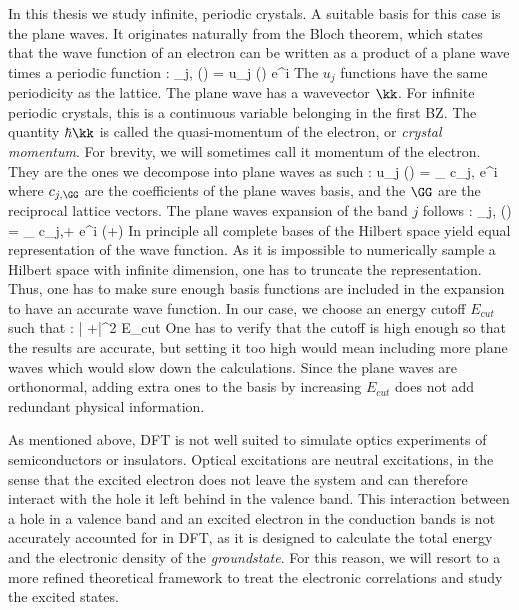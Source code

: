 In this thesis we study infinite, periodic crystals. A suitable basis for this case is the plane waves. It originates naturally from the Bloch theorem, which states that the wave function of an electron can be written as a product of a plane wave times a periodic function :
\be
 	\phi_{j,\kk} (\rr) = u_j (\rr) e^{i\kk\cdot\rr}
\ee
The $u_j$ functions have the same periodicity as the lattice. The plane wave has a wavevector $\kk$. For infinite periodic crystals, this is a continuous variable belonging in the first \gls{BZ}. The quantity $\hbar \kk$ is called the quasi-momentum of the electron, or \textit{crystal momentum}. For brevity, we will sometimes call it momentum of the electron.
They are the ones we decompose into plane waves as such :
\be
 	u_j (\rr) = \sum_{\GG} c_{j,\GG} e^{i\GG \cdot \rr}
\ee
where $c_{j,\GG}$ are the coefficients of the plane waves basis, and the $\GG$ are the reciprocal lattice vectors. The plane waves expansion of the band $j$ follows :
\be
	\phi_{j,\kk} (\rr) = \sum_{\GG} c_{j,\kk+\GG} e^{i (\kk+\GG)\cdot \rr}
\ee
In principle all complete bases of the Hilbert space yield equal representation of the wave function. As it is impossible to numerically sample a Hilbert space with infinite dimension, one has to truncate the representation. Thus, one has to make sure enough basis functions are included in the expansion to have an accurate wave function. In our case, we choose an energy cutoff $E_{cut}$ such that :
\be
	 \left| \kk+\GG \right|^2 \leq E_{cut}
\ee
One has to verify that the cutoff is high enough so that the results are accurate, but setting it too high would mean including more plane waves which would slow down the calculations. Since the plane waves are orthonormal, adding extra ones to the basis by increasing $E_{cut}$ does not add redundant physical information.

As mentioned above, \gls{DFT} is not well suited to simulate optics experiments of semiconductors or insulators. Optical excitations are neutral excitations, in the sense that the excited electron does not leave the system and can therefore interact with the hole it left behind in the valence band. This interaction between a hole in a valence band and an excited electron in the conduction bands is not accurately accounted for in \gls{DFT}, as it is designed to calculate the total energy and the electronic density of the \textit{groundstate}. For this reason, we will resort to a more refined theoretical framework to treat the electronic correlations and study the excited states.

